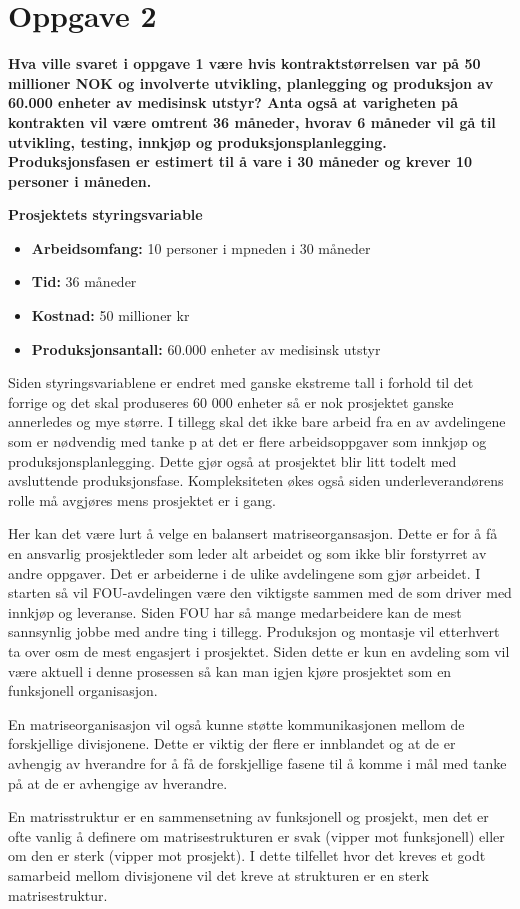 \section*{Oppgave 2}

	{\bf Hva ville svaret i oppgave 1 være hvis kontraktstørrelsen var på 50 millioner
	NOK og involverte utvikling, planlegging og produksjon av 60.000 enheter av medisinsk utstyr?
	Anta også at varigheten på kontrakten vil være omtrent 36 måneder, hvorav 6 måneder vil gå til
	utvikling, testing, innkjøp og produksjonsplanlegging. Produksjonsfasen er estimert til å vare
	i 30 måneder og krever 10 personer i måneden.} 

	{\bf Prosjektets styringsvariable}
		\begin{itemize}
			\item {\bf Arbeidsomfang:} 10 personer i mpneden i 30 måneder
			\item {\bf Tid:} 36 måneder
			\item {\bf Kostnad:} 50 millioner kr
			\item {\bf Produksjonsantall:} 60.000 enheter av medisinsk utstyr
		\end{itemize}

		Siden styringsvariablene er endret med ganske ekstreme tall i forhold til det forrige og det 
		skal produseres 60 000 enheter så er nok prosjektet ganske annerledes og mye større.
		I tillegg skal det ikke bare arbeid fra en av avdelingene som er nødvendig med tanke p at det er 
		flere arbeidsoppgaver som innkjøp og produksjonsplanlegging. Dette gjør også at prosjektet blir 
		litt todelt med avsluttende produksjonsfase. Kompleksiteten økes også siden underleverandørens 
		rolle må avgjøres mens prosjektet er i gang.

		Her kan det være lurt å velge en balansert matriseorgansasjon. Dette er for å få en ansvarlig 
		prosjektleder som leder alt arbeidet og som ikke blir forstyrret av andre oppgaver. Det er 
		arbeiderne i de ulike avdelingene som gjør arbeidet. I starten så vil FOU-avdelingen være den 
		viktigste sammen med de som driver med innkjøp og leveranse. Siden FOU har så mange medarbeidere 
		kan de mest sannsynlig jobbe med andre ting i tillegg. Produksjon og montasje vil etterhvert ta 
		over osm de mest engasjert i prosjektet. Siden dette er kun en avdeling som vil være aktuell i 
		denne prosessen så kan man igjen kjøre prosjektet som en funksjonell organisasjon.

		En matriseorganisasjon vil også kunne støtte kommunikasjonen mellom de forskjellige divisjonene. 
		Dette er viktig der flere er innblandet og at de er avhengig av hverandre for å få de forskjellige
		fasene til å komme i mål med tanke på at de er avhengige av hverandre. 

		En matrisstruktur er en sammensetning av funksjonell og prosjekt, men det er ofte vanlig å definere
		om matrisestrukturen er svak (vipper mot funksjonell) eller om den er sterk (vipper mot prosjekt).
		I dette tilfellet hvor det kreves et godt samarbeid mellom divisjonene vil det kreve at 
		strukturen er en sterk matrisestruktur. 

